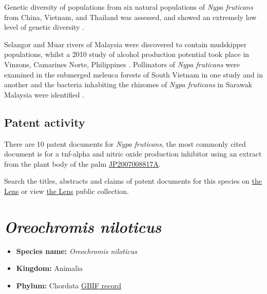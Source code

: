 \documentclass[openany]{book}
\providecommand{\tightlist}{%
  \setlength{\itemsep}{0pt}\setlength{\parskip}{0pt}}
\theoremstyle{definition}
\theoremstyle{definition}
\theoremstyle{definition}
\theoremstyle{remark}
\begin{document}
Genetic diversity of populations from six natural populations of
\emph{Nypa fruticans} from China, Vietnam, and Thailand was assessed,
and showed an extremely low level of genetic diversity
\citep{Jian_2010}.

Selangor and Muar rivers of Malaysia were discovered to contain
mudskipper populations, whilst a 2010 study of alcohol production
potential took place in Vinzons, Camarines Norte, Philippines
\citep{Rasco_2010}. Pollinators of \emph{Nypa fruticans} were examined
in the submerged meleuca forests of South Vietnam in one study and in
another and the bacteria inhabiting the rhizomes of \emph{Nypa
fruticans} in Sarawak Malaysia were identified
\citep{Quang_Tan_2008, Tang_2010}.

\hypertarget{patent-activity-4}{%
\subsection{Patent activity}\label{patent-activity-4}}

There are 10 patent documents for \emph{Nypa fruticans}, the most
commonly cited document is for a tnf-alpha and nitric oxide production
inhibitor using an extract from the plant body of the palm
\href{https://www.lens.org/lens/patent/JP_2007008817_A}{JP2007008817A}.

Search the titles, abstracts and claims of patent documents for this
species on
\href{https://www.lens.org/lens/search?q=title:(\%22Nypa\%20fruticans\%22)\%20OR\%20abstract:(\%22Nypa\%20fruticans\%22)\%20OR\%20claims:(\%22Nypa\%20fruticans\%22)\&l=en\&types=Patent\%20Application\&types=Granted\%20Patent\&preview=true}{the
Lens} or view \href{https://www.lens.org/lens/collection/167814}{the
Lens} public collection.

\hypertarget{oreochromis-niloticus}{%
\section{\texorpdfstring{\emph{Oreochromis
niloticus}}{Oreochromis niloticus}}\label{oreochromis-niloticus}}

\begin{itemize}
\tightlist
\item
  \textbf{Species name:} \emph{Oreochromis niloticus}
\item
  \textbf{Kingdom:} Animalia\\
\item
  \textbf{Phylum:} Chordata
  \href{https://www.gbif.org/species/4285694}{GBIF record}
\end{itemize}
\end{document}
